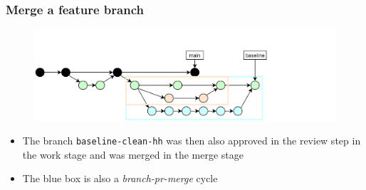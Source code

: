 \documentclass[aspectratio=169]{beamer} %
\begin{document}
\begin{frame}
	\frametitle{Merge a feature branch}
	
	\vspace{-.5cm}
	\begin{minipage}[t][5cm][t]{\textwidth}
		\begin{figure}
			\centering
			\includegraphics[width=\textwidth]{./img/dime-gitflow-network-2-5.png}
		\end{figure}
	\end{minipage}  
	
	\vspace{-.5cm}
	\begin{minipage}[t][5cm][t]{\textwidth}
		\begin{itemize}
			\setlength\itemsep{.5em}
			\item The branch \texttt{baseline-clean-hh} was then also approved in the review step in the work stage and was merged in the merge stage
			\item The blue box is also a \textit{branch-pr-merge} cycle
		\end{itemize}
	\end{minipage}  
\end{frame}
\end{document}
